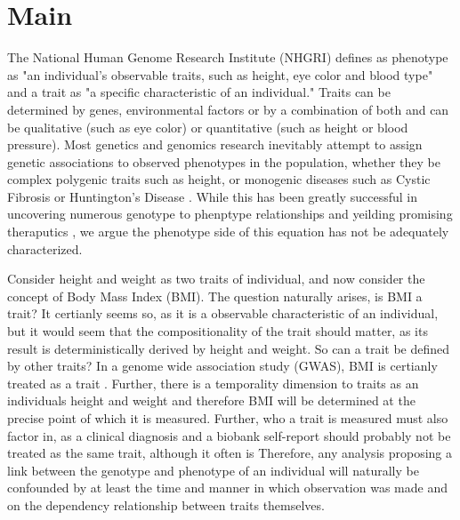 \section{Main}
\label{sec:introduction}

The National Human Genome Research Institute (NHGRI) defines as phenotype as "an individual’s observable traits, such as height, eye color and blood type" and a trait as "a specific characteristic of an individual." \cite{nhgri_glossary} Traits can be determined by genes, environmental factors or by a combination of both and can be qualitative (such as eye color) or quantitative (such as height or blood pressure). Most genetics and genomics research inevitably attempt to assign genetic associations to observed phenotypes in the population, whether they be complex polygenic traits such as height, or monogenic diseases such as Cystic Fibrosis \cite{riordan1989} or Huntington's Disease \cite{hdcrg1993}. While this has been greatly successful in uncovering numerous genotype to phenptype relationships and yeilding promising theraputics \cite{minikel2024}, we argue the phenotype side of this equation has not be adequately characterized.

Consider height and weight as two traits of individual, and now consider the concept of Body Mass Index (BMI). The question naturally arises, is BMI a trait? It certianly seems so, as it is a observable characteristic of an individual, but it would seem that the compositionality of the trait should matter, as its result is deterministically derived by height and weight. So can a trait be defined by other traits? In a genome wide association study (GWAS), BMI is certianly treated as a trait \cite{yengo2018}. Further, there is a temporality dimension to traits as an individuals height and weight and therefore BMI will be determined at the precise point of which it is measured. Further, who a trait is measured must also factor in, as a clinical diagnosis and a biobank self-report should probably not be treated as the same trait, although it often is \cite{schoeler2025,hu2025} Therefore, any analysis proposing a link between the genotype and phenotype of an individual will naturally be confounded by at least the time and manner in which observation was made and on the dependency relationship between traits themselves.

